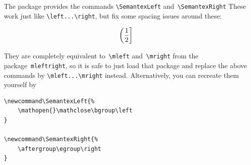 \documentclass[a4paper,article,oneside,english,10pt]{memoir}
\newcommand\mylst{\lstinline[mathescape]}
\let\pack=\texttt
\begin{document}
The package provides the commands \mylst!\SemantexLeft!
and~\mylst!\SemantexRight!
These work just like \lstinline!\left...\right!, but fix some spacing issues
around these:
\begin{LTXexample}
\[
	\SemantexLeft(
		\frac{1}{2}
	\SemantexRight]
\]
\end{LTXexample}
They are completely equivalent to~\lstinline!\mleft! and~\lstinline!\mright!
from the package~\pack{mleftright}, so it is safe to just load that package
and replace the above commands by \lstinline!\mleft...\mright! instead.
Alternatively, you can recreate them yourself by
\begin{lstlisting}
\newcommand\SemantexLeft{%
	\mathopen{}\mathclose\bgroup\left
}

\newcommand\SemantexRight{%
	\aftergroup\egroup\right
}
\end{lstlisting}
\end{document}
